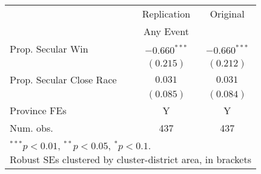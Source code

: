 
\begin{tabular}{l c c}
\hline
 & Replication & Original \\
& Any Event & \\
\hline
Prop. Secular Win        & $-0.660^{***}$  & $-0.660^{***}$\\
                         & $(0.215)$       & $(0.212)$\\
Prop. Secular Close Race & $0.031$         & $0.031$\\
                         & $(0.085)$       & $(0.084)$\\
\hline
Province FEs             & Y               & Y\\
Num. obs.                & 437             & 437\\
\hline
\multicolumn{3}{l}{\scriptsize{\parbox{.4\linewidth}{\vspace{2pt}$^{***}p<0.01$, $^{**}p<0.05$, $^*p<0.1$. \\
       Robust SEs clustered by cluster-district area, in brackets\\}}}
\end{tabular}
